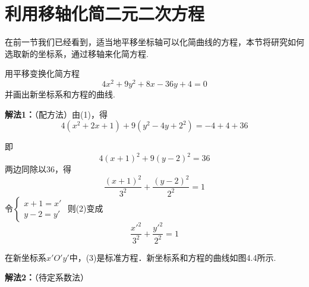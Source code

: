 \section{利用移轴化简二元二次方程}
在前一节我们已经看到，适当地平移坐标轴可以化简曲线的方程，本节将研究如何选取新的坐标系，通过移轴来化简方程.

\begin{example}
    用平移变换化简方程
    \begin{equation}
 4x^2+9y^2+8x-36y+4=0       \tag{1}
    \end{equation}
并画出新坐标系和方程的曲线.
\end{example}

\begin{solution}
\textbf{解法1：}（配方法）由(1)，得
\[4(x^2+2x+1)+9(y^2-4y+2^2)=-4+4+36\]

\noindent
\begin{minipage}{.52\textwidth}
即
\[4(x+1)^2+9(y-2)^2=36\]
两边同除以36，得
\begin{equation}
    \frac{(x+1)^2}{3^2}+\frac{(y-2)^2}{2^2}=1  \tag{2}
\end{equation}
令$\begin{cases}
    x+1=x'\\ y-2=y'
\end{cases}$
则(2)变成
\begin{equation}
\frac{{x'}^2}{3^2}+\frac{{y'}^2}{2^2}=1\tag{3}
\end{equation}
\end{minipage}
\hfill
\begin{minipage}{.45\textwidth}
\centering
{}
\end{minipage}

在新坐标系$x'O'y'$中，(3)是标准方程．新坐标系和方程的曲线如图4.4所示.

\textbf{解法2：}（待定系数法）


\end{solution}
